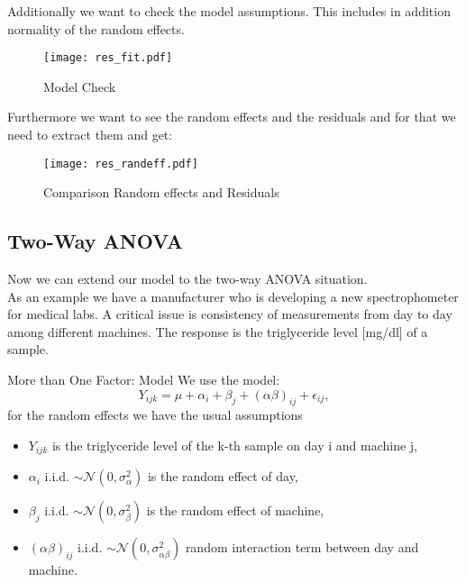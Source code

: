 \documentclass[unknownkeysallowed]{beamer}
\begin{document}
\begin{frame}
	Additionally we want to check the model assumptions. This includes in addition normality of the random effects.
		\begin{figure}
		\centering
		\texttt{[image: res\_fit.pdf]}
		\caption{Model Check}
		\label{fig:my_label}
	\end{figure}
\end{frame}

	


\begin{frame}
	Furthermore we want to see the random effects and the residuals and for that we need to extract them and get:
	\begin{figure}
		\centering
		\texttt{[image: res\_randeff.pdf]}
		\caption{Comparison Random effects and Residuals}
		\label{fig:my_label}
	\end{figure}
	
\end{frame}


\subsection{Two-Way ANOVA}
\begin{frame}
	Now we can extend our model to the two-way ANOVA situation.\\
	As an example we have a manufacturer who is developing a new spectrophometer for medical labs. A critical issue is consistency of measurements from day to day among different machines. The response is the triglyceride level [mg/dl] of a sample.
\end{frame}

\begin{frame}{More than One Factor: Model}
	 We use the model:
	\begin{equation*}
		Y_{ijk} = \mu + \alpha_i + \beta_j + (\alpha \beta)_{ij} + \epsilon_{ij},
	\end{equation*}
	for the random effects we have the usual assumptions
	\begin{itemize}
		\item $Y_{ijk}$ is the triglyceride level of the k-th sample on day i and machine j,
		\item $\alpha_i$ i.i.d.  
		$\sim \mathcal{N}(0,\sigma^2_{\alpha})$ is the random effect of day,
		\item $\beta_j$ i.i.d.  
		$\sim \mathcal{N}(0,\sigma^2_{\beta})$ is the random effect of machine,
		\item $(\alpha \beta)_{ij}$ i.i.d.  
		$\sim \mathcal{N}(0,\sigma^2_{\alpha \beta})$ random interaction term between day and machine.
	\end{itemize}
\end{frame}
\end{document}
